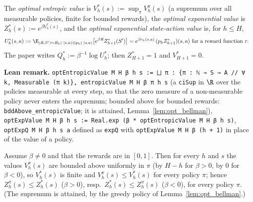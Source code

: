 \begin{definition}\label{def:opt_value}
\leanok
{}
The \emph{optimal entropic value} is $V^*_h(s) := \sup_\pi V^\pi_h(s)$ (a supremum over all
measurable policies, finite for bounded rewards), the \emph{optimal exponential value} is $Z^*_h(s) := e^{\beta V^*_h(s)}$, and the
\emph{optimal exponential state-action value} is, for $h \le H$,
\[
  U^*_h(s, a) := \E_{(R, S') \sim R_h(\cdot \mid s, a) \otimes p_h(\cdot \mid s, a)}
    \big[e^{\beta R} Z^*_{h+1}(S')\big]
  = e^{\beta r_h(s, a)}\,(p_h Z^*_{h+1})(s, a) \text{ for a reward function } r .
\]
The paper writes $Q^*_h := \beta^{-1} \log U^*_h$; then $Z^*_{H+1} = 1$ and $V^*_{H+1} = 0$.
\end{definition}

\textbf{Lean remark.} \texttt{optEntropicValue M H β h s := ⨆ π : \{π : ℕ → S → A // ∀ k, Measurable (π k)\}, entropicValue M H β π h s}
(a \texttt{ciSup} in $\R$ over the policies measurable at every step, so that the zero measure
of a non-measurable policy never enters the supremum; bounded above for bounded rewards:
\texttt{bddAbove\_entropicValue}; it is attained, Lemma~\ref{lem:opt_bellman}),
\texttt{optExpValue M H β h s := Real.exp (β * optEntropicValue M H β h s)},
\texttt{optExpQ M H β h s a} defined as \texttt{expQ} with \texttt{optExpValue M H β (h + 1)} in
place of the value of a policy.

\begin{lemma}\label{lem:opt_exp_value_eq}
\leanok
{}
Assume $\beta \ne 0$ and that the rewards are in $[0, 1]$. Then for every $h$ and $s$ the values
$V^\pi_h(s)$ are bounded above uniformly in $\pi$ (by $H - h$ for $\beta > 0$, by $0$ for
$\beta < 0$), so $V^*_h(s)$ is finite and $V^\pi_h(s) \le V^*_h(s)$ for every policy $\pi$; hence
$Z^\pi_h(s) \le Z^*_h(s)$ ($\beta > 0$), resp.\ $Z^*_h(s) \le Z^\pi_h(s)$ ($\beta < 0$), for every
policy $\pi$. (The supremum is attained, by the greedy policy of Lemma~\ref{lem:opt_bellman}.)
\end{lemma}

